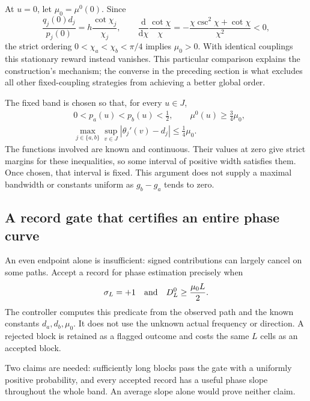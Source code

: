 \documentclass[11pt,a4paper]{article}
\numberwithin{equation}{section}
\theoremstyle{remark}
\begin{document}
At $u=0$, let $\mu_0=\mu^0(0)$.  Since
\begin{equation}
 \frac{q_j(0)d_j}{p_j(0)}
 =h\frac{\cot\chi_j}{\chi_j},
 \qquad
 \frac{\mathrm d}{\mathrm d\chi}\frac{\cot\chi}{\chi}
 =-\frac{\chi\csc^2\chi+\cot\chi}{\chi^2}<0,
 \label{phase:positive}
\end{equation}
the strict ordering $0<\chi_a<\chi_b<\pi/4$ implies $\mu_0>0$.
With identical couplings this stationary reward instead vanishes.  This
particular comparison explains the construction's mechanism; the converse
in the preceding section is what excludes all other fixed-coupling
strategies from achieving a better global order.

The fixed band is chosen so that, for every $u\in J$,
\begin{align}
 &0<p_a(u)<p_b(u)<\tfrac12,
 \qquad \mu^0(u)\ge\tfrac34\mu_0,\label{phase:band1}\\
 &\max_{j\in\{a,b\}}\sup_{v\in J}|\theta_j'(v)-d_j|
 \le\tfrac14\mu_0.
 \label{phase:band2}
\end{align}
The functions involved are known and continuous.  Their values at zero give
strict margins for these inequalities, so some interval of positive width
satisfies them.  Once chosen, that interval is fixed.  This argument does
not supply a maximal bandwidth or constants uniform as $g_b-g_a$ tends to
zero.

\subsection{A record gate that certifies an entire phase curve}
\label{phase:gate}

An even endpoint alone is insufficient: signed contributions can largely
cancel on some paths.  Accept a record for phase estimation precisely when
\begin{equation}
 \sigma_L=+1
 \quad\hbox{and}\quad
 D_L^0\ge\frac{\mu_0L}{2}.
 \label{phase:predicate}
\end{equation}
The controller computes this predicate from the observed path and the known
constants $d_a,d_b,\mu_0$.  It does not use the unknown actual frequency or
direction.  A rejected block is retained as a flagged outcome and costs the
same $L$ cells as an accepted block.

Two claims are needed: sufficiently long blocks pass the gate with a
uniformly positive probability, and every accepted record has a useful phase
slope throughout the whole band.  An average slope alone would prove
neither claim.
\end{document}

